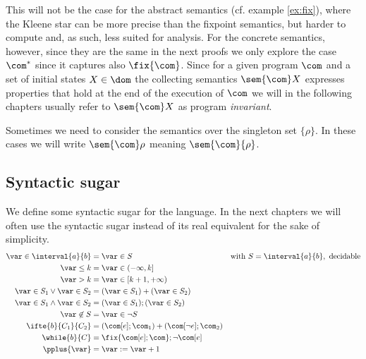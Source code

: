 This will not be the case for the abstract semantics (cf. example
\ref{ex:fix}), where the Kleene star can be more precise than the
fixpoint semantics, but harder to compute and, as such, less suited
for analysis. For the concrete semantics, however, since they are the
same in the next proofs we only explore the case \(\com^*\) since it
captures also \(\fix{\com}\). Since for a given program \(\com\) and a
set of initial states \(X \in \dom\) the collecting semantics
\(\sem{\com}X\) expresses properties that hold at the end of the
execution of \(\com\) we will in the following chapters usually refer
to \(\sem{\com}X\) as program \emph{invariant}.

\begin{notation}
  Sometimes we need to consider the semantics over the singleton set
  \(\{\rho\}\). In these cases we will write \(\sem{\com}\rho\)
  meaning \(\sem{\com}\{\rho\}\).
\end{notation}


\subsection{Syntactic sugar}\label{sub:sugar}
We define some syntactic sugar for the language. In the next chapters
we will often use the syntactic sugar instead of its real equivalent
for the sake of simplicity.
\begin{align*}
  \var \in \interval{a}{b} & = \var \in S & \text{with } S = \interval{a}{b}, \text{ decidable}\\
  \var \leq k & = \var \in (-\infty, k]\\
  \var > k & = \var \in [k+1, + \infty) \\
  \var \in S_1 \vee \var \in S_2 & = (\var \in S_1) + (\var \in S_2) \\ 
  \var \in S_1 \wedge \var \in S_2 & = (\var \in S_1);(\var \in S_2) \\
  \var \not\in S & = \var \in \neg S \\
  \ifte{b}{C_1}{C_2} & = (\com[e];\com_1) + (\com[\neg e];\com_2) \\
  \while{b}{C} & = \fix{\com[e];\com};\neg\com[e] \\
  \pplus{\var} & = \var := \var + 1
\end{align*}

